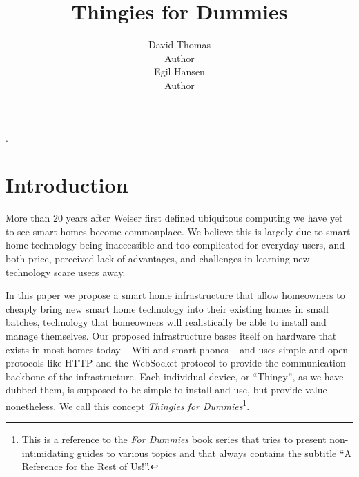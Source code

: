 \documentclass{ubicomp2012}
\begin{document}
\setlength{\paperheight}{11in}
\setlength{\paperwidth}{8.5in}
\setlength{\pdfpageheight}{\paperheight}
\setlength{\pdfpagewidth}{\paperwidth}


\title{Thingies for Dummies}
\author{
  \alignauthor David Thomas\\
    Author\\
 \alignauthor Egil Hansen\\
    Author\\
      }
\maketitle

\begin{abstract}

\end{abstract}


.


\section{Introduction}

More than 20 years after Weiser first defined ubiquitous computing \cite{Weiser1991} we have yet to see smart homes become commonplace. We believe this is largely due to smart home technology being inaccessible and too complicated for everyday users, and both price, perceived lack of advantages, and challenges in learning new technology scare users away.

In this paper we propose a smart home infrastructure that allow homeowners to cheaply bring new smart home technology into their existing homes in small batches, technology that homeowners will realistically be able to install and manage themselves. Our proposed infrastructure bases itself on hardware that exists in most homes today -- Wifi and smart phones -- and uses simple and open protocols like HTTP and the WebSocket protocol to provide the communication backbone of the infrastructure. Each individual device, or ``Thingy'', as we have dubbed them, is supposed to be simple to install and use, but provide value nonetheless. We call this concept \textit{Thingies for Dummies}\footnote{This is a reference to the \textit{For Dummies} book series that tries to present non-intimidating guides to various topics and that always contains the subtitle ``A Reference for the Rest of Us!''.}.
\end{document}
